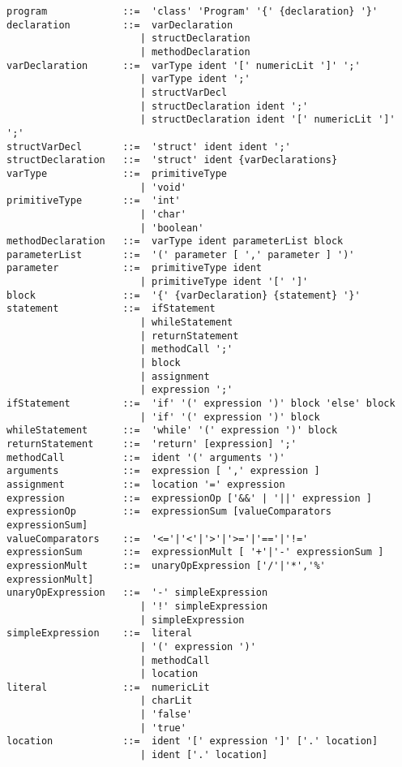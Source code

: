 \documentclass[12pt,letterpaper]{article}
\begin{document}
\begin{lstlisting}
program             ::=  'class' 'Program' '{' {declaration} '}'
declaration         ::=  varDeclaration
                       | structDeclaration 
                       | methodDeclaration
varDeclaration      ::=  varType ident '[' numericLit ']' ';'
                       | varType ident ';'
                       | structVarDecl
                       | structDeclaration ident ';'
                       | structDeclaration ident '[' numericLit ']' ';'
structVarDecl       ::=  'struct' ident ident ';'
structDeclaration   ::=  'struct' ident {varDeclarations}
varType             ::=  primitiveType 
                       | 'void'
primitiveType       ::=  'int' 
                       | 'char'
                       | 'boolean'
methodDeclaration   ::=  varType ident parameterList block
parameterList       ::=  '(' parameter [ ',' parameter ] ')'
parameter           ::=  primitiveType ident
                       | primitiveType ident '[' ']'
block               ::=  '{' {varDeclaration} {statement} '}'
statement           ::=  ifStatement 
                       | whileStatement
                       | returnStatement
                       | methodCall ';'
                       | block
                       | assignment
                       | expression ';'
ifStatement         ::=  'if' '(' expression ')' block 'else' block
                       | 'if' '(' expression ')' block                       
whileStatement      ::=  'while' '(' expression ')' block
returnStatement     ::=  'return' [expression] ';'
methodCall          ::=  ident '(' arguments ')'
arguments           ::=  expression [ ',' expression ]
assignment          ::=  location '=' expression
expression          ::=  expressionOp ['&&' | '||' expression ]
expressionOp        ::=  expressionSum [valueComparators expressionSum]
valueComparators    ::=  '<='|'<'|'>'|'>='|'=='|'!='
expressionSum       ::=  expressionMult [ '+'|'-' expressionSum ]
expressionMult      ::=  unaryOpExpression ['/'|'*','%' expressionMult]
unaryOpExpression   ::=  '-' simpleExpression 
                       | '!' simpleExpression
                       | simpleExpression
simpleExpression    ::=  literal
                       | '(' expression ')'
                       | methodCall
                       | location
literal             ::=  numericLit 
                       | charLit 
                       | 'false' 
                       | 'true'
location            ::=  ident '[' expression ']' ['.' location]
                       | ident ['.' location] 
\end{lstlisting}
\end{document}
